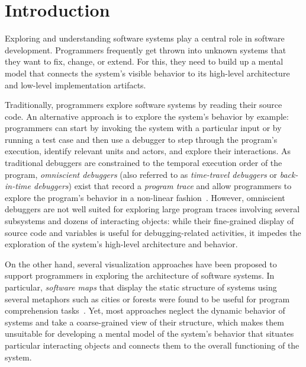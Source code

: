 \section{Introduction}
\label{sec:introduction}

Exploring and understanding software systems play a central role in software development.
Programmers frequently get thrown into unknown systems that they want to fix, change, or extend.
For this, they need to build up a mental model that connects the system's visible behavior to its high-level architecture and low-level implementation artifacts.

Traditionally, programmers explore software systems by reading their source code.
An alternative approach is to explore the system's behavior by example:
programmers can start by invoking the system with a particular input or by running a test case and then use a debugger to step through the program's execution, identify relevant units and actors, and explore their interactions.
As traditional debuggers are constrained to the temporal execution order of the program, \emph{omniscient debuggers} (also referred to as \emph{time-travel debuggers} or \emph{back-in-time debuggers}) exist that record a \emph{program trace} and allow programmers to explore the program's behavior in a non-linear fashion~\cite{lewis2003debugging,hofer2006design,pothier2009back,lienhard2008practical,thiede2023object}.
However, omniscient debuggers are not well suited for exploring large program traces involving several subsystems and dozens of interacting objects:
while their fine-grained display of source code and variables is useful for debugging-related activities, it impedes the exploration of the system's high-level architecture and behavior.

On the other hand, several visualization approaches have been proposed to support programmers in exploring the architecture of software systems.
In particular, \emph{software maps} that display the static structure of systems using several metaphors such as cities or forests were found to be useful for program comprehension tasks~\cite{wettel2007visualizing,atzberger2021softwareforest,limberger2022visual}.
Yet, most approaches neglect the dynamic behavior of systems and take a coarse-grained view of their structure, which makes them unsuitable for developing a mental model of the system's behavior that situates particular interacting objects and connects them to the overall functioning of the system.

